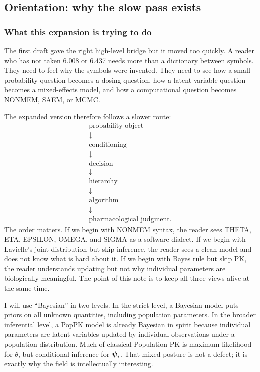 \subsection{Orientation: why the slow pass exists}

\subsubsection*{What this expansion is trying to do}

The first draft gave the right high-level bridge but it moved too quickly.  A reader who has not taken 6.008 or 6.437 needs more than a dictionary between symbols.  They need to feel why the symbols were invented.  They need to see how a small probability question becomes a dosing question, how a latent-variable question becomes a mixed-effects model, and how a computational question becomes NONMEM, SAEM, or MCMC.

The expanded version therefore follows a slower route:
\[
  \begin{array}{c}
    \text{probability object}\\
    \downarrow\\
    \text{conditioning}\\
    \downarrow\\
    \text{decision}\\
    \downarrow\\
    \text{hierarchy}\\
    \downarrow\\
    \text{algorithm}\\
    \downarrow\\
    \text{pharmacological judgment}.
  \end{array}
\]
The order matters.  If we begin with NONMEM syntax, the reader sees THETA, ETA, EPSILON, OMEGA, and SIGMA as a software dialect.  If we begin with Lavielle's joint distribution but skip inference, the reader sees a clean model and does not know what is hard about it.  If we begin with Bayes rule but skip PK, the reader understands updating but not why individual parameters are biologically meaningful.  The point of this note is to keep all three views alive at the same time.

\begin{remark}
  I will use ``Bayesian'' in two levels.  In the strict level, a Bayesian model puts priors on all unknown quantities, including population parameters.  In the broader inferential level, a PopPK model is already Bayesian in spirit because individual parameters are latent variables updated by individual observations under a population distribution.  Much of classical Population PK is maximum likelihood for \(\theta\), but conditional inference for \(\boldsymbol{\psi}_i\).  That mixed posture is not a defect; it is exactly why the field is intellectually interesting.
\end{remark}

